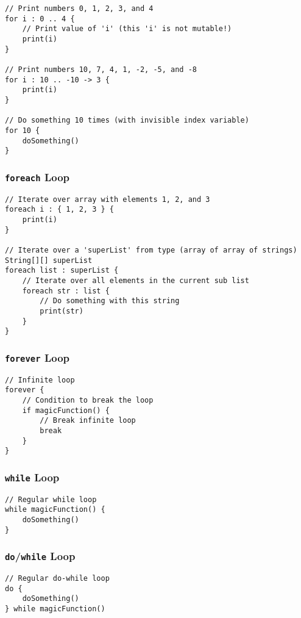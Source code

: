 \documentclass{report}
\begin{document}
\begin{lstlisting}
// Print numbers 0, 1, 2, 3, and 4
for i : 0 .. 4 {
    // Print value of 'i' (this 'i' is not mutable!)
    print(i)
}

// Print numbers 10, 7, 4, 1, -2, -5, and -8
for i : 10 .. -10 -> 3 {
    print(i)
}

// Do something 10 times (with invisible index variable)
for 10 {
    doSomething()
}
\end{lstlisting}

\subsubsection{\texttt{foreach} Loop}

\begin{lstlisting}
// Iterate over array with elements 1, 2, and 3
foreach i : { 1, 2, 3 } {
    print(i)
}

// Iterate over a 'superList' from type (array of array of strings)
String[][] superList
foreach list : superList {
    // Iterate over all elements in the current sub list
    foreach str : list {
        // Do something with this string
        print(str)
    }
}
\end{lstlisting}

\subsubsection{\texttt{forever} Loop}

\begin{lstlisting}
// Infinite loop
forever {
    // Condition to break the loop
    if magicFunction() {
        // Break infinite loop
        break
    }
}
\end{lstlisting}

\subsubsection{\texttt{while} Loop}

\begin{lstlisting}
// Regular while loop
while magicFunction() {
    doSomething()
}
\end{lstlisting}

\subsubsection{\texttt{do}/\texttt{while} Loop}

\begin{lstlisting}
// Regular do-while loop
do {
    doSomething()
} while magicFunction()
\end{lstlisting}
\end{document}
